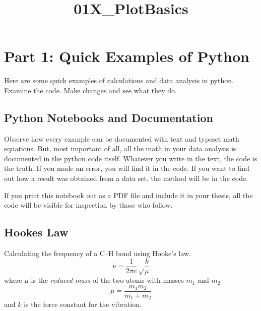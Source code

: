 \documentclass[11pt]{article}
\title{01X\_PlotBasics}
\begin{document}
    
    \maketitle
    
    

    
    \section{Part 1: Quick Examples of
Python}\label{part-1-quick-examples-of-python}

Here are some quick examples of calculations and data analysis in
python. Examine the code. Make changes and see what they do.

\subsection{Python Notebooks and
Documentation}\label{python-notebooks-and-documentation}

Observe how every example can be documented with text and typeset math
equations. But, most important of all, all the math in your data
analysis is documented in the python code itself. Whatever you write in
the text, the code is the truth. If you made an error, you will find it
in the code. If you want to find out how a result was obtained from a
data set, the method will be in the code.

If you print this notebook out as a PDF file and include it in your
thesis, all the code will be visible for inspection by those who follow.

    \subsection{Hookes Law}\label{hookes-law}

Calculating the frequency of a C--H bond using Hooke's law.
\[\bar{\nu} = \frac{1}{2\pi c}\sqrt\frac{k}{\mu}\] where \(\mu\) is the
\emph{reduced mass} of the two atoms with masses \(m_1\) and \(m_2\)
\[\mu = \frac{m_1m_2}{m_1+m_2}\] and \(k\) is the force constant for the
vibration.
\end{document}
